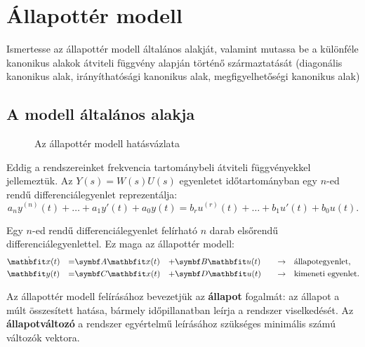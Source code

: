 \section{Állapottér modell}

\begin{about}
  Ismertesse az állapottér modell általános alakját, valamint mutassa be a
  különféle kanonikus alakok átviteli függvény alapján történő származtatását
  (diagonális kanonikus alak, irányíthatósági kanonikus alak, megfigyelhetőségi
  kanonikus alak)
\end{about}

\subsection{A modell általános alakja}

\begin{figure}[htb]
  \centering
  
  \caption{Az állapottér modell hatásvázlata}
  \label{fig:state-space}
\end{figure}

Eddig a rendszereinket frekvencia tartománybeli átviteli függvényekkel
jellemeztük. Az $Y(s) = W(s) U(s)$ egyenletet időtartományban egy $n$-ed
rendű differenciálegyenlet reprezentálja:
\begin{equation}
  a_{n  } y^{(n)  }(t)
  +
  \dots
  +
  a_1 y'(t)
  +
  a_0 y(t)
  =
  b_{r  } u^{(r)  }(t)
  +
  \dots
  +
  b_1 u'(t)
  +
  b_0 u(t)
  .
  \label{eq:YWU-time}
\end{equation}

Egy $n$-ed rendű differenciálegyenlet felírható $n$ darab elsőrendű
differenciálegyenlettel. Ez maga az állapottér modell:
\begin{alignat}{9}
   & \dot{\rvec x} (t)       & =                         & \rmat A \rvec x(t) & + & \rmat B \rvec u(t)
   & \quad \rightarrow \quad & \text{állapotegyenlet,}
  \\
   & \rvec y (t)             & =                         & \rmat C \rvec x(t) & + & \rmat D \rvec u(t)
   & \quad \rightarrow \quad & \text{kimeneti egyenlet.}
\end{alignat}

Az állapottér modell felírásához bevezetjük az \textbf{állapot} fogalmát:
az állapot a múlt összesített hatása, bármely időpillanatban leírja a rendszer
viselkedését. Az \textbf{állapotváltozó} a rendszer egyértelmű leírásához
szükséges minimális számú változók vektora.

